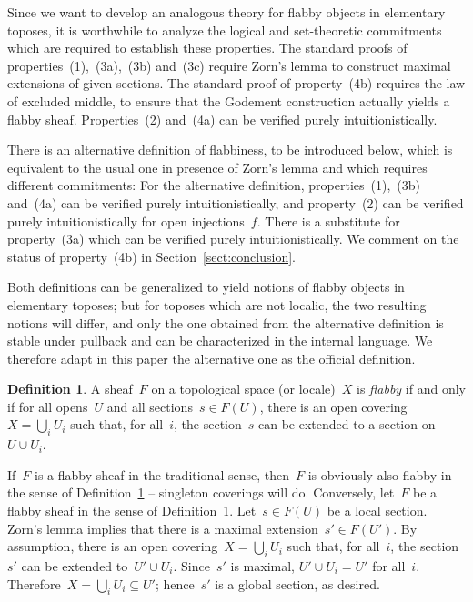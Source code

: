 \documentclass[oneside]{amsart}
\theoremstyle{definition}
\newtheorem{defn}{Definition}[section]
\theoremstyle{plain}
\theoremstyle{remark}
\renewcommand{\_}{\mathpunct{.}\,}
\begin{document}
Since we want to develop an analogous theory for flabby objects in elementary
toposes, it is worthwhile to analyze the logical and set-theoretic commitments
which are required to establish these properties. The standard proofs of
properties~(1),~(3a),~(3b) and~(3c) require Zorn's lemma to construct maximal
extensions of given sections. The standard proof of property~(4b) requires the
law of excluded middle, to ensure that the Godement construction actually
yields a flabby sheaf. Properties~(2) and~(4a) can be verified purely
intuitionistically.

There is an alternative definition of flabbiness, to be introduced below, which
is equivalent to the usual one in presence of Zorn's lemma and which
requires different commitments: For the alternative definition,
properties~(1),~(3b) and~(4a) can be verified purely intuitionistically, and
property~(2) can be verified purely intuitionistically for open injections~$f$.
There is a substitute for property~(3a) which can be verified purely
intuitionistically. We comment on the status of property~(4b) in
Section~\ref{sect:conclusion}.

Both definitions can be generalized to yield notions of flabby objects in
elementary toposes; but for toposes which are not localic, the two resulting
notions will differ, and only the one obtained from the alternative definition
is stable under pullback and
can be characterized in the internal language. We therefore adapt in this paper the
alternative one as the official definition.

\begin{defn}\label{defn:flabby-sheaf}
A sheaf~$F$ on a topological space (or locale)~$X$ is \emph{flabby}
if and only if for all opens~$U$ and all sections~$s \in F(U)$, there is an
open covering~$X = \bigcup_i U_i$ such that, for all~$i$, the section~$s$ can
be extended to a section on~$U \cup U_i$.\end{defn}

If~$F$ is a flabby sheaf in the traditional sense, then~$F$ is obviously also
flabby in the sense of Definition~\ref{defn:flabby-sheaf} -- singleton
coverings will do. Conversely, let~$F$ be a flabby sheaf in the sense of
Definition~\ref{defn:flabby-sheaf}. Let~$s \in F(U)$ be a local section. Zorn's
lemma implies that there is a maximal extension~$s' \in F(U')$. By assumption,
there is an open covering~$X = \bigcup_i U_i$ such that, for all~$i$, the
section~$s'$ can be extended to~$U' \cup U_i$. Since~$s'$ is maximal, $U' \cup
U_i = U'$ for all~$i$. Therefore~$X = \bigcup_i U_i \subseteq U'$; hence~$s'$ is a
global section, as desired.
\end{document}
